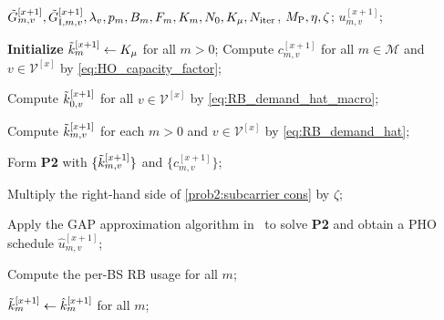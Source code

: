 \documentclass[conference, a4paper]{IEEEtran}
\newcommand{\rev}[1]{\textcolor{revisioncolor}{{}#1}}
\newif\ifshowdeletions
\newcommand{\currentdel}[1]{\ifshowdeletions\textcolor{deletioncolor}{\sout{#1}}\fi}
\theoremstyle{remark}
\begin{document}
\begin{algorithm}[htbp]
    \caption{Generalized Assignment-based Proactive Handover (GAP-HO)}
    \label{alg:GAP-HO}
    \renewcommand{\algorithmicrequire}{\textbf{Input:}}
    \renewcommand{\algorithmicensure}{\textbf{Output:}}
    \begin{algorithmic}[1]
        \REQUIRE
        $\Tilde{G}_{m,v}^{[x+1]}, \Tilde{G}_{{\rm I},m,v}^{[x+1]}, \lambda_v, p_m, B_m, F_m, K_m, N_0, K_\mu, N_{\rm iter}$, $M_{\rm P}, \eta, \zeta$\currentdel{$, \epsilon$};
        \ENSURE
        $u_{m,v}^{[x+1]}$;

        \STATE \textbf{Initialize} $\Tilde{k}_{m}^{[x+1]} \gets K_\mu$ for all $m>0$;
        \STATE \rev{Compute $c_{m,v}^{[x+1]}$ for all $m \in \mathcal{M}$ and $v \in \mathcal{V}^{[x]}$ by \eqref{eq:HO_capacity_factor};}

        \STATE Compute $\Tilde{k}_{0,v}^{[x+1]}$ for all $v \in \mathcal{V}^{[x]}$
        by \eqref{eq:RB_demand_hat_macro};

            \STATE Compute $\Tilde{k}_{m,v}^{[x+1]}$ for each $m>0$ and $v \in \mathcal{V}^{[x]}$ by \eqref{eq:RB_demand_hat};

            \STATE Form \textbf{P2} with $\{\Tilde{k}_{m,v}^{[x+1]}\}$\rev{ and $\{c_{m,v}^{[x+1]}\}$};
            
                \STATE Multiply the right-hand side of \eqref{prob2:subcarrier cons} by $\zeta$;
            \ENDWHILE

            \STATE Apply the GAP approximation algorithm in~\cite{shmoys1993approximation}
                   to solve \textbf{P2} and obtain a PHO schedule
                   $\hat{u}_{m,v}^{[x+1]}$;

            \STATE Compute the \currentdel{implied} per-BS RB usage
            \currentdel{$\hat{k}_{m}^{[x+1]} = \sum_{v \in \mathcal{V}^{[x]}}\Tilde{k}_{m,v}^{[x+1]} \hat{u}_{m,v}^{[x+1]}$} for all $m$;

            \ifshowdeletions
                \STATE \currentdel{\textbf{if} $\max_m \bigl|\hat{k}_{m}^{[x+1]} - \Tilde{k}_{m}^{[x+1]}\bigr| \leq \epsilon$ \textbf{then}}
                \STATE \currentdel{$\Tilde{k}_{m}^{[x+1]} \gets \hat{k}_{m}^{[x+1]}$ for all $m$;}
                \STATE \currentdel{\textbf{break};}
                \STATE \currentdel{\textbf{else}}
                \STATE \currentdel{$\Tilde{k}_{m}^{[x+1]} \gets \hat{k}_{m}^{[x+1]}$ for all $m$;}
                \STATE \currentdel{\textbf{end if}}
            \fi
            \STATE \rev{$\Tilde{k}_{m}^{[x+1]} \gets \hat{k}_{m}^{[x+1]}$ for all $m$;}
        \ENDFOR


\end{algorithmic}
\end{algorithm}
\end{document}

